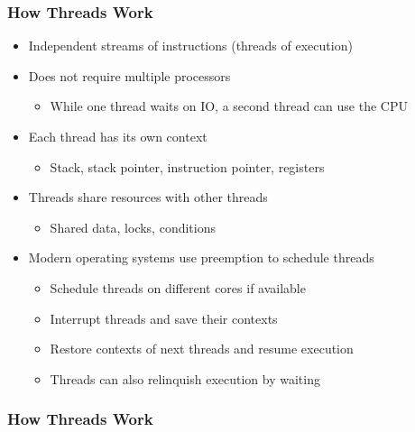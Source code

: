 \begin{slide}[fragile]
\frametitle{How Threads Work}

\begin{itemize}
\item Independent streams of instructions (threads of execution)
\item Does not require multiple processors
  \begin{itemize}
  \item While one thread waits on IO, a second thread can use the CPU
  \end{itemize}
\item Each thread has its own context
  \begin{itemize}
  \item Stack, stack pointer, instruction pointer, registers
  \end{itemize}
\item Threads share resources with other threads
  \begin{itemize}
  \item Shared data, locks, conditions
  \end{itemize}
\vspace{1em}
\item Modern operating systems use preemption to schedule threads
  \begin{itemize}
  \item Schedule threads on different cores if available 
  \item Interrupt threads and save their contexts
  \item Restore contexts of next threads and resume execution
  \item Threads can also relinquish execution by waiting
  \end{itemize}
\end{itemize}

\end{slide}


\begin{slide}
\frametitle{How Threads Work}

\vspace{3em}

\end{slide}


